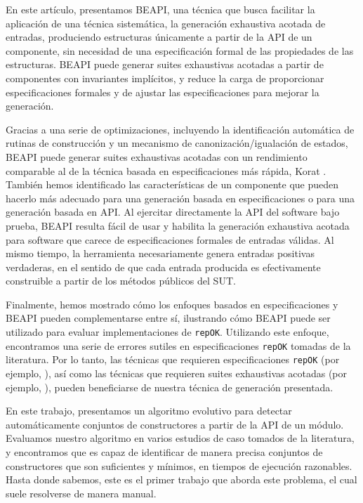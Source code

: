 En este artículo, presentamos BEAPI, una técnica que busca facilitar la aplicación de una técnica sistemática, 
la generación exhaustiva acotada de entradas, produciendo estructuras únicamente a partir de la API de un componente, 
sin necesidad de una especificación formal de las propiedades de las estructuras. BEAPI puede generar suites exhaustivas acotadas 
a partir de componentes con invariantes implícitos, y reduce la carga de proporcionar especificaciones formales y de ajustar 
las especificaciones para mejorar la generación. 

Gracias a una serie de optimizaciones, incluyendo la identificación automática de 
rutinas de construcción y un mecanismo de canonización/igualación de estados, BEAPI puede generar suites exhaustivas acotadas con 
un rendimiento comparable al de la técnica basada en especificaciones más rápida, Korat \cite{Boyapati02}. También hemos identificado las
características de un componente que pueden hacerlo más adecuado para una generación basada en especificaciones o para una generación basada en API.
Al ejercitar directamente la API del software bajo prueba, BEAPI resulta fácil de usar y habilita la generación exhaustiva acotada para software que carece de especificaciones formales de entradas válidas. 
Al mismo tiempo, la herramienta necesariamente genera entradas positivas verdaderas, en el sentido de que cada entrada producida es efectivamente construible a partir de los métodos públicos del SUT.


Finalmente, hemos mostrado cómo los enfoques basados en especificaciones y BEAPI pueden complementarse entre sí, 
ilustrando cómo BEAPI puede ser utilizado para evaluar implementaciones de \texttt{repOK}. Utilizando este enfoque, 
encontramos una serie de errores sutiles en especificaciones \texttt{repOK} tomadas de la literatura. Por lo tanto, 
las técnicas que requieren especificaciones \texttt{repOK} (por ejemplo, \cite{Rosner15}), así como las técnicas que requieren 
suites exhaustivas acotadas (por ejemplo, \cite{Molina+2021}), pueden beneficiarse de nuestra técnica de generación presentada.



En este trabajo, presentamos un algoritmo evolutivo para detectar automáticamente conjuntos de constructores a partir de la API de un módulo. 
Evaluamos nuestro algoritmo en varios estudios de caso tomados de la literatura, y encontramos que es capaz de identificar de manera precisa conjuntos de constructores que son suficientes y mínimos, 
en tiempos de ejecución razonables. Hasta donde sabemos, este es el primer trabajo que aborda este problema, el cual suele resolverse de manera manual.

